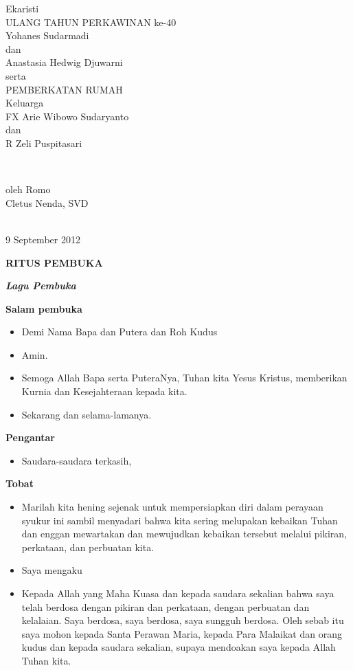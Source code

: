 \documentclass[12pt,twoside,anypage]{scrbook}
\makeatletter
\newcommand{\judul}[1]{%
  {\parindent \z@ \centering \normalfont
    \interlinepenalty\@M \large \bfseries #1\par\nobreak \vskip 20\p@ }}
\newcommand{\subjudul}[1]{%
  {\parindent \z@ \normalfont
    \interlinepenalty\@M \bfseries #1\par\nobreak \vskip 20\p@ }}
\newcommand{\lagu}[1]{%
  {\parindent \z@ \normalfont
    \interlinepenalty\@M \bfseries \emph{#1}\par\nobreak \vskip 20\p@ }}
\newcommand{\BU}[1]{\begin{itemize} \item[U:] #1 \end{itemize}}
\newcommand{\BI}[1]{\begin{itemize} \item[I:] #1 \end{itemize}}
\newcommand{\kelbpk}{FX Arie Wibowo Sudaryanto\xspace}
\newcommand{\kelibu}{R Zeli Puspitasari\xspace}
\newcommand{\ibu}{Anastasia Hedwig Djuwarni\xspace}
\newcommand{\bapak}{Yohanes Sudarmadi\xspace}
\newcommand{\romo}{Cletus Nenda, SVD\xspace}
\makeatother
\begin{document}
\thispagestyle{empty}
\begin{center}
{\PT Ekaristi} 
\vspace{1cm}\\
{\PTsmall ULANG TAHUN PERKAWINAN ke-40}
\vspace{0.5cm}\\
{\PTsmallest \bapak \\dan\\ \ibu}\\
 
\vspace{1.5cm}
{\PTsmallest serta}\\
\vspace{1.5cm}
{\PTsmall PEMBERKATAN RUMAH}
\vspace{0.5cm}\\
{\PTsmallest Keluarga \\ \kelbpk \\dan\\ \kelibu}
 
{~}\vspace{2.5cm}

oleh Romo\\ \romo

{~}\\

9 September 2012

\end{center}

\newpage
\judul{RITUS PEMBUKA}
\lagu{Lagu Pembuka}


\subjudul{Salam pembuka}

\BI{Demi Nama Bapa dan Putera dan Roh Kudus}
\BU{Amin.}
\BI{Semoga Allah Bapa serta PuteraNya, Tuhan kita Yesus Kristus, memberikan Kurnia dan Kesejahteraan kepada kita.}
\BU{Sekarang dan selama-lamanya.}

\subjudul{Pengantar}

\BI{Saudara-saudara terkasih, 

}

\subjudul{Tobat}
\BI{Marilah kita hening sejenak untuk mempersiapkan diri dalam perayaan syukur ini sambil menyadari bahwa kita sering melupakan kebaikan Tuhan dan enggan mewartakan dan mewujudkan kebaikan tersebut melalui pikiran, perkataan, dan perbuatan kita.}

\BI{Saya mengaku}

\BU{Kepada Allah yang Maha Kuasa dan kepada saudara sekalian bahwa saya telah berdosa dengan pikiran dan perkataan, dengan perbuatan dan kelalaian. Saya berdosa, saya berdosa, saya sungguh berdosa. Oleh sebab itu saya mohon kepada Santa Perawan Maria, kepada Para Malaikat dan orang kudus dan kepada saudara sekalian, supaya mendoakan saya kepada Allah Tuhan kita.}
\end{document}
